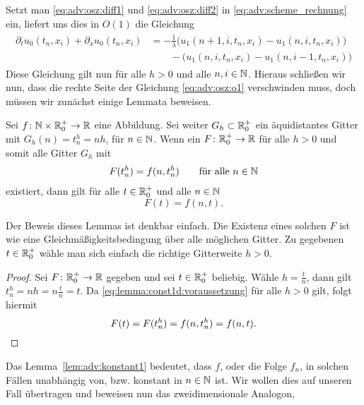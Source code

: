 Setzt man \eqref{eq:adv:osz:diff1} und \eqref{eq:adv:osz:diff2} in \eqref{eq:adv:scheme_rechnung} ein, liefert uns dies in $O(1)$ die Gleichung
\begin{align}\label{eq:adv:osz:o1}
\begin{split}
\partial_t u_0(t_n, x_i) + \partial_x u_0(t_n, x_i) &= - \frac 1 \lambda \bigl( u_1(n+1, i, t_n, x_i) - u_1(n, i, t_n, x_i) \bigr)\\
&\qquad - \bigl(u_1(n, i, t_n, x_i) - u_1(n, i-1, t_n, x_i) \bigr)
\end{split}
\end{align}
Diese Gleichung gilt nun für alle $h > 0$ und alle $n, i \in \mathbb N$.
Hieraus schließen wir nun, dass die rechte Seite der Gleichung \eqref{eq:adv:osz:o1} verschwinden muss, doch müssen wir zunächst einige Lemmata beweisen.

\begin{lemma} \label{lem:adv:konstant1}
Sei $f\colon \mathbb N \times \mathbb R^+_0 \to \mathbb R$ eine Abbildung.
Sei weiter $G_h \subset \mathbb R^+_0$ ein äquidistantes Gitter mit $G_h(n) = t^h_n = n h$, für $n \in \mathbb N$.
Wenn ein $F\colon \mathbb R^+_0 \to \mathbb R$ für alle $h > 0$ und somit alle Gitter $G_h$ mit
\begin{align}\label{eq:lemma:const1d:voraussetzung}
F(t^h_n) = f(n, t^h_n) \qquad \text{für alle $n \in \mathbb N$}
\end{align}
existiert, dann gilt für alle $t \in \mathbb R^+_0$ und alle $n \in \mathbb N$
\[ F(t) = f(n, t). \]
\end{lemma}
Der Beweis dieses Lemmas ist denkbar einfach. Die Existenz eines solchen $F$ ist wie eine Gleichmäßigkeitsbedingung über alle möglichen Gitter.
Zu gegebenen $t \in \mathbb R^+_0$ wähle man sich einfach die richtige Gitterweite $h > 0$.
\begin{proof}
Sei $F\colon \mathbb R^+_0 \to \mathbb R$ gegeben und sei $t \in \mathbb R^+_0$ beliebig.
Wähle $h = \frac{t}{n}$, dann gilt $t^h_n = nh = n \frac{t}{n} = t$.
Da \eqref{eq:lemma:const1d:voraussetzung} für alle $h > 0$ gilt, folgt hiermit 
\[ F(t) = F(t^h_n) = f(n, t^h_n) = f(n, t). \qedhere \]
\end{proof}

Das Lemma~\ref{lem:adv:konstant1} bedeutet, dass $f$, oder die Folge $f_n$, in solchen Fällen unabhängig von, bzw. konstant in $n \in \mathbb N$ ist.
Wir wollen dies auf unseren Fall übertragen und beweisen nun das zweidimensionale Analogon, 

